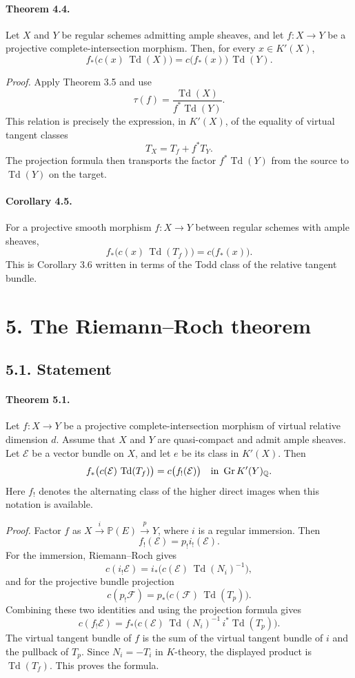 \documentclass[12pt]{article}
\newcommand{\QQ}{\mathbb Q}
\newcommand{\bP}{\mathbb P}
\newcommand{\cE}{\mathcal E}
\newcommand{\cF}{\mathcal F}
\newcommand{\Gr}{\operatorname{Gr}}
\newcommand{\Todd}{\operatorname{Td}}
\newcommand{\xto}[1]{\xrightarrow{#1}}
\begin{document}
\paragraph{Theorem 4.4.}
Let $X$ and $Y$ be regular schemes admitting ample sheaves, and let $f:X\to Y$ be a projective complete-intersection morphism. Then, for every $x\in K'(X)$,
\[
 f_*\bigl(c(x)\,\Todd(X)\bigr)=c\bigl(f_*(x)\bigr)\,\Todd(Y).
\]

\emph{Proof.}
Apply Theorem 3.5 and use
\[
 \tau(f)=\frac{\Todd(X)}{f^*\Todd(Y)}.
\]
This relation is precisely the expression, in $K'(X)$, of the equality of virtual tangent classes
\[
T_X=T_f+f^*T_Y.
\]
The projection formula then transports the factor $f^*\Todd(Y)$ from the source to $\Todd(Y)$ on the target.

\paragraph{Corollary 4.5.}
For a projective smooth morphism $f:X\to Y$ between regular schemes with ample sheaves,
\[
 f_*\bigl(c(x)\,\Todd(T_f)\bigr)=c\bigl(f_*(x)\bigr).
\]
This is Corollary 3.6 written in terms of the Todd class of the relative tangent bundle.

\section*{5. The Riemann--Roch theorem}

\subsection*{5.1. Statement}

\paragraph{Theorem 5.1.}
Let $f:X\to Y$ be a projective complete-intersection morphism of virtual relative dimension $d$. Assume that $X$ and $Y$ are quasi-compact and admit ample sheaves. Let $\cE$ be a vector bundle on $X$, and let $e$ be its class in $K'(X)$. Then
\[
 f_*\bigl(c(\cE)\,\Todd(T_f)\bigr)=c\bigl(f_!(\cE)\bigr)
 \quad\hbox{in }\Gr K'(Y)_\QQ .
\]
Here $f_!$ denotes the alternating class of the higher direct images when this notation is available.

\emph{Proof.}
Factor $f$ as $X\xto{i}\bP(E)\xto{p}Y$, where $i$ is a regular immersion. Then
\[
f_!(\cE)=p_!i_!(\cE).
\]
For the immersion, Riemann--Roch gives
\[
 c(i_!\cE)=i_*\bigl(c(\cE)\,\Todd(N_i)^{-1}\bigr),
\]
and for the projective bundle projection
\[
 c(p_!\cF)=p_*\bigl(c(\cF)\,\Todd(T_p)\bigr).
\]
Combining these two identities and using the projection formula gives
\[
 c(f_!\cE)=f_*\bigl(c(\cE)\,\Todd(N_i)^{-1}\,i^*\Todd(T_p)\bigr).
\]
The virtual tangent bundle of $f$ is the sum of the virtual tangent bundle of $i$ and the pullback of $T_p$. Since $N_i=-T_i$ in $K$-theory, the displayed product is $\Todd(T_f)$. This proves the formula.
\end{document}
